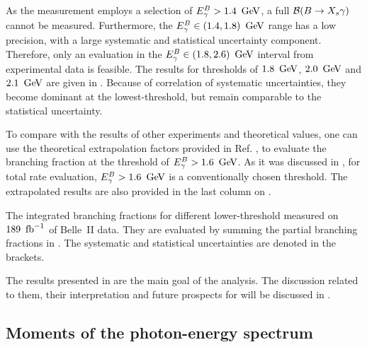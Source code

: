 As the measurement employs a selection of ${E^B_{\gamma}}>1.4~\mathrm{\,Ge\kern -0.1em V}$, a full $\mathcal{B}(\BtoXsgamma)$ cannot be measured.
Furthermore, the ${E^B_{\gamma}}\in(1.4,1.8)~\mathrm{\,Ge\kern -0.1em V}$ range has a low precision, with a large systematic and statistical uncertainty component.
Therefore, only an evaluation in the ${E^B_{\gamma}}\in(1.8,2.6)~\mathrm{\,Ge\kern -0.1em V}$ interval from experimental data is feasible.
The results for thresholds of $1.8~\mathrm{\,Ge\kern -0.1em V}$, $2.0~\mathrm{\,Ge\kern -0.1em V}$ and $2.1~\mathrm{\,Ge\kern -0.1em V}$ are given in .
Because of correlation of systematic uncertainties, they become dominant at the lowest-\EB threshold, but remain comparable to the statistical uncertainty.

To compare with the results of other experiments and theoretical values,
one can use the theoretical extrapolation factors provided in Ref. \cite{Buchmuller:2005zv},
to evaluate the branching fraction at the threshold of ${E^B_{\gamma}}>1.6~\mathrm{\,Ge\kern -0.1em V}$.
As it was discussed in , for \BtoXsgamma total rate evaluation, ${E^B_{\gamma}}>1.6~\mathrm{\,Ge\kern -0.1em V}$ is a conventionally chosen threshold.
The extrapolated results are also provided in the last column on .

\begin{table}[htbp!]
    \centering
    \caption{\label{tab:integrated_branching_fractions}
    The integrated \BtoXsgamma branching fractions for different lower-\EB threshold measured on $189~\mbox{\,fb}^{-1}$ of Belle~II data.
    They are evaluated by summing the partial branching fractions in .
    The systematic and statistical uncertainties are denoted in the brackets.
    }
    
\end{table}

The results presented in  are the main goal of the analysis.
The discussion related to them, their interpretation and future prospects for \BtoXsgamma will be discussed in .



\subsection{Moments of the \safeBtoXsgamma photon-energy spectrum}\label{sec:spectrum_moments}

